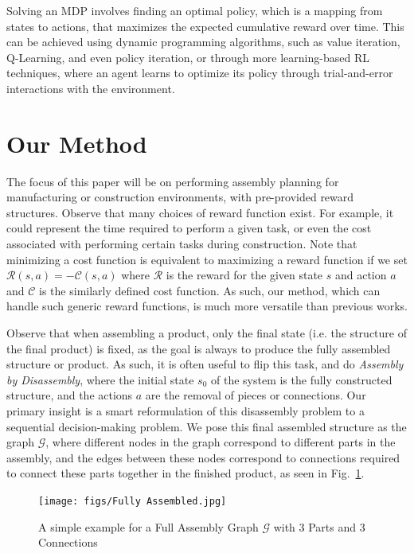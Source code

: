 \documentclass{article}
\begin{document}
Solving an MDP involves finding an optimal policy, which is a mapping from states to actions, that maximizes the expected cumulative reward over time. This can be achieved using dynamic programming algorithms, such as value iteration, Q-Learning, and even policy iteration, or through more learning-based RL techniques, where an agent learns to optimize its policy through trial-and-error interactions with the environment.


\section{Our Method}
The focus of this paper will be on performing assembly planning for manufacturing or construction environments, with pre-provided reward structures. Observe that many choices of reward function exist. For example, it could represent the time required to perform a given task, or even the cost associated with performing certain tasks during construction. Note that minimizing a cost function is equivalent to maximizing a reward function if we set $\mathcal{R}(s,a) = -\mathcal{C}(s,a)$ where $\mathcal{R}$ is the reward for the given state $s$ and action $a$ and $\mathcal{C}$ is the similarly defined cost function. As such, our method, which can handle such generic reward functions, is much more versatile than previous works.

Observe that when assembling a product, only the final state (i.e. the structure of the final product) is fixed, as the goal is always to produce the fully assembled structure or product. As such, it is often useful to flip this task, and do \emph{Assembly by Disassembly}, where the initial state $s_0$ of the system is the fully constructed structure, and the actions $a$ are the removal of pieces or connections. Our primary insight is a smart reformulation of this disassembly problem to a sequential decision-making problem. We pose this final assembled structure as the graph $\mathcal{G}$, where different nodes in the graph correspond to different parts in the assembly, and the edges between these nodes correspond to connections required to connect these parts together in the finished product, as seen in Fig.~\ref{fig: G}.


\begin{figure}[!htb]
    \centering
    \texttt{[image: figs/Fully Assembled.jpg]}
      \caption{A simple example for a Full Assembly Graph $\mathcal{G}$ with 3 Parts and 3 Connections}
      \label{fig: G}
\end{figure}
\end{document}
